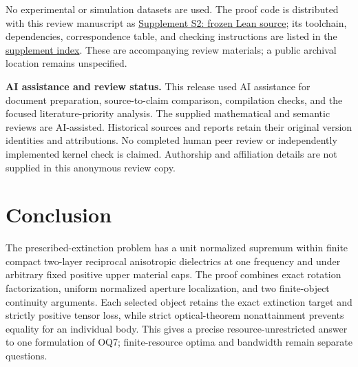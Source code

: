 \documentclass[11pt]{article}
\begin{document}
No experimental or simulation datasets are used. The proof code is distributed with this review manuscript as \href{reproducibility/OQ7-complete-physical-theorem11-source.zip}{Supplement S2: frozen Lean source}; its toolchain, dependencies, correspondence table, and checking instructions are listed in the \href{reproducibility/SUPPLEMENT_INDEX.html}{supplement index}. These are accompanying review materials; a public archival location remains unspecified.

\noindent\textbf{AI assistance and review status.}
This release used AI assistance for document preparation, source-to-claim comparison, compilation checks, and the focused literature-priority analysis. The supplied mathematical and semantic reviews are AI-assisted. Historical sources and reports retain their original version identities and attributions. No completed human peer review or independently implemented kernel check is claimed. Authorship and affiliation details are not supplied in this anonymous review copy.

\section{Conclusion}\label{sec:conclusion}
The prescribed-extinction problem has a unit normalized supremum within finite compact two-layer reciprocal anisotropic dielectrics at one frequency and under arbitrary fixed positive upper material caps. The proof combines exact rotation factorization, uniform normalized aperture localization, and two finite-object continuity arguments. Each selected object retains the exact extinction target and strictly positive tensor loss, while strict optical-theorem nonattainment prevents equality for an individual body. This gives a precise resource-unrestricted answer to one formulation of OQ7; finite-resource optima and bandwidth remain separate questions.

\appendix
\end{document}
